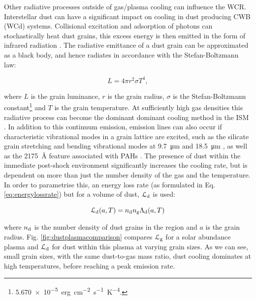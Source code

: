 Other radiative processes outside of gas/plasma cooling can influence the WCR.
Interstellar dust can have a significant impact on cooling in dust producing CWB (WCd) systems.
Collisional excitation and adsorption of photons can stochastically heat dust grains, this excess energy is then emitted in the form of infrared radiation \parencite{dwekCoolingSputteringInfrared1996}.
The radiative emittance of a dust grain can be approximated as a black body, and hence radiates in accordance with the Stefan-Boltzmann law:

\begin{equation}
  L = 4\pi r^2 \sigma T^4 , 
\end{equation}

\noindent
where $L$ is the grain luminance, $r$ is the grain radius, $\sigma$ is the Stefan-Boltzmann constant\footnote{\SI{5.670e-5}{erg.cm^{-2}.s^{-1}.K^{-4}}.} and $T$ is the grain temperature.
At sufficiently high gas densities this radiative process can become the dominant dominant cooling method in the ISM \parencite{wolfireNeutralAtomicPhases1995}.
In addition to this continuum emission, emission lines can also occur if characteristic vibrational modes in a grain lattice are excited, such as the silicate grain stretching and bending vibrational modes at \SI{9.7}{\micro\metre} and \SI{18.5}{\micro\metre} \parencite[212]{whittetDustGalacticEnvironment2002}, as well as the \SI{2175}{\angstrom} feature associated with PAHs \parencite{draineInterstellarDustGrains2003}.
The presence of dust within the immediate post-shock environment significantly increases the cooling rate, but is dependent on more than just the number density of the gas and the temperature.
In order to parametrise this, an energy loss rate (as formulated in Eq. \ref{eq:energylossrate}) but for a volume of dust, $\mathcal{L}_\text{d}$ is used:

\begin{equation}
  \mathcal{L}_\text{d} (a,T) = n_\text{d} n_\text{g} \Lambda_\text{d} (a,T)
\end{equation}

\noindent
where $n_\text{d}$ is the number density of dust grains in the region and $a$ is the grain radius.
Fig. \ref{fig:dustplasmacomparison} compares $\mathcal{L}_\text{g}$ for a solar abundance plasma and $\mathcal{L}_\text{d}$ for dust within this plasma at varying grain sizes.
As we can see, small grain sizes, with the same dust-to-gas mass ratio, dust cooling dominates at high temperatures, before reaching a peak emission rate.

